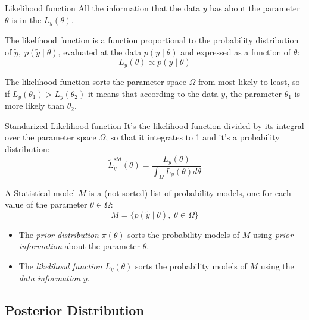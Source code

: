 \begin{definition}{Likelihood function}{}{}
	All the information that the data $y$ has about the parameter $\theta$ is in the
	 $L_y(\theta)$.

	The likelihood function is a function proportional to the probability distribution
	of $\tilde{y},\; p(\tilde{y}\mid\theta)$, evaluated at the data $p(y \mid \theta)$
	and expressed as a function of $\theta$:
	\begin{equation}
		L_y(\theta) \propto p(y \mid \theta)
	\end{equation}
\end{definition}

The likelihood function sorts the parameter space $\Omega$ from most likely to least,
so if $L_y(\theta_1) > L_y(\theta_2)$ it means that according to the data $y$,
the parameter $\theta_1$ is more likely than $\theta_2$.

\begin{definition}{Standarized Likelihood function}{}{}
	It's the likelihood function divided by its integral over the parameter space $\Omega$,
	so that it integrates to 1 and it's a probability distribution:
	\begin{equation}
		\tilde{L}_y^{std}(\theta) = \frac{L_y(\theta)}{\int_{\Omega} L_y(\theta) d\theta}
	\end{equation}
\end{definition}


\begin{recap}{}{}{}
	A Statistical model $M$ is a (not sorted) list of probability models, one for
	each value of the parameter $\theta \in \Omega$:
	\begin{equation*}
		M = \{ p(\tilde{y}\mid\theta), \; \theta \in \Omega \}
	\end{equation*}

	\begin{itemize}
		\item The \emph{prior distribution} $\pi(\theta)$ sorts the probability models of $M$
		      using \emph{prior information} about the parameter $\theta$.
		\item The \emph{likelihood function} $L_y(\theta)$ sorts the probability models of $M$
		      using the \emph{data information} $y$.
	\end{itemize}
\end{recap}

\subsection{Posterior Distribution}

